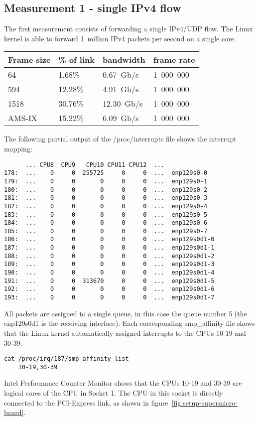 
\subsection{Measurement 1 - single IPv4 flow}
The first measurement consists of forwarding a single IPv4/UDP flow.
The Linux kernel is able to forward 1~million IPv4 packets per second on a single core.
\\
\begin{tabular}{ | l | l | l | l | }
\hline
Frame size & \% of link & bandwidth & frame rate \\
\hline
64     &  1.68\% &  0.67~Gb/s & 1~000~000 \\
594    & 12.28\% &  4.91~Gb/s & 1~000~000 \\
1518   & 30.76\% & 12.30~Gb/s & 1~000~000 \\
AMS-IX & 15.22\% &  6.09~Gb/s & 1~000~000 \\
\hline
\end{tabular}

The following partial output of the /proc/interrupts file shows the interrupt mapping:
\begin{lstlisting}
      ... CPU8  CPU9   CPU10 CPU11 CPU12  ...
178:  ...    0     0  255725     0     0  ...  enp129s0-0
179:  ...    0     0       0     0     0  ...  enp129s0-1
180:  ...    0     0       0     0     0  ...  enp129s0-2
181:  ...    0     0       0     0     0  ...  enp129s0-3
182:  ...    0     0       0     0     0  ...  enp129s0-4
183:  ...    0     0       0     0     0  ...  enp129s0-5
184:  ...    0     0       0     0     0  ...  enp129s0-6
185:  ...    0     0       0     0     0  ...  enp129s0-7
186:  ...    0     0       0     0     0  ...  enp129s0d1-0
187:  ...    0     0       0     0     0  ...  enp129s0d1-1
188:  ...    0     0       0     0     0  ...  enp129s0d1-2
189:  ...    0     0       0     0     0  ...  enp129s0d1-3
190:  ...    0     0       0     0     0  ...  enp129s0d1-4
191:  ...    0     0  313670     0     0  ...  enp129s0d1-5
192:  ...    0     0       0     0     0  ...  enp129s0d1-6
193:  ...    0     0       0     0     0  ...  enp129s0d1-7
\end{lstlisting}
All packets are assigned to a single queue, in this case the queue number 5 (the enp129s0d1 is the receiving interface).
Each corresponding smp\_affinity file shows that the Linux kernel
automatically assigned interrupts to the CPUs 10-19 and 30-39.
\begin{lstlisting}
cat /proc/irq/187/smp_affinity_list
	10-19,30-39
\end{lstlisting}
Intel Performance Counter Monitor shows that the CPUs 10-19 and 30-39 are
logical cores of the CPU in Socket 1.
The CPU in this socket is directly connected to the PCI-Express link, as shown in figure~\ref{fig:setup-supermicro-board}.

